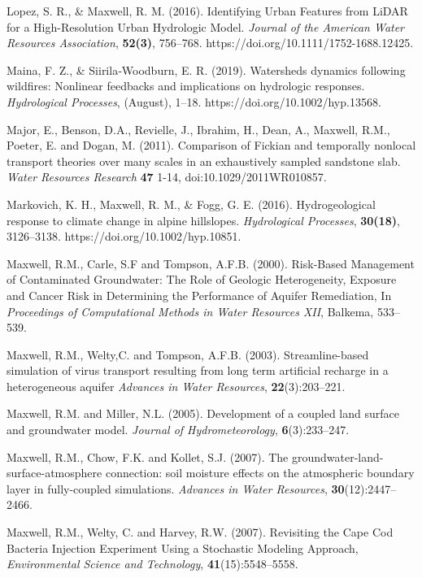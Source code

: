 \begin{thebibliography}{999}
Lopez, S. R., \& Maxwell, R. M. (2016). Identifying Urban Features from LiDAR for a High-Resolution Urban Hydrologic Model. {\em Journal of the American Water Resources Association}, {\bf 52(3)}, 756–768. https://doi.org/10.1111/1752-1688.12425.


Maina, F. Z., \& Siirila‐Woodburn, E. R. (2019). Watersheds dynamics following wildfires: Nonlinear feedbacks and implications on hydrologic responses. {\em Hydrological Processes}, (August), 1–18. https://doi.org/10.1002/hyp.13568.


Major, E., Benson, D.A., Revielle, J., Ibrahim, H., Dean, A., Maxwell, R.M., Poeter, E. and Dogan, M. (2011). Comparison of Fickian and temporally nonlocal transport theories over many scales in an exhaustively sampled sandstone slab. {\em Water Resources Research} {\bf 47} 1-14, doi:10.1029/2011WR010857.

Markovich, K. H., Maxwell, R. M., \& Fogg, G. E. (2016). Hydrogeological response to climate change in alpine hillslopes. {\em Hydrological Processes}, {\bf 30(18)}, 3126–3138. https://doi.org/10.1002/hyp.10851.


Maxwell, R.M., Carle, S.F and Tompson, A.F.B. (2000). Risk-Based Management of Contaminated Groundwater: The Role of Geologic Heterogeneity, Exposure and Cancer Risk in Determining the Performance of Aquifer Remediation, In {\em Proceedings of Computational Methods in Water Resources XII}, Balkema, 533--539.

 Maxwell, R.M., Welty,C. and Tompson, A.F.B. (2003).
Streamline-based simulation of virus transport resulting from long term
artificial recharge in a heterogeneous aquifer {\em Advances in Water
Resources}, {\bf 22}(3):203--221.

Maxwell, R.M. and Miller, N.L. (2005). Development of a coupled land surface and groundwater model.  {\em Journal of Hydrometeorology}, {\bf 6}(3):233--247.

Maxwell, R.M., Chow, F.K. and Kollet, S.J. (2007). The groundwater-land-surface-atmosphere connection: soil moisture effects on the atmospheric boundary layer in fully-coupled simulations. {\em Advances in Water Resources}, {\bf 30}(12):2447--2466.

Maxwell, R.M., Welty, C. and Harvey, R.W. (2007). Revisiting the Cape Cod Bacteria Injection Experiment Using a Stochastic Modeling Approach, {\em Environmental Science and Technology}, { \bf 41}(15):5548--5558.


\end{thebibliography}
